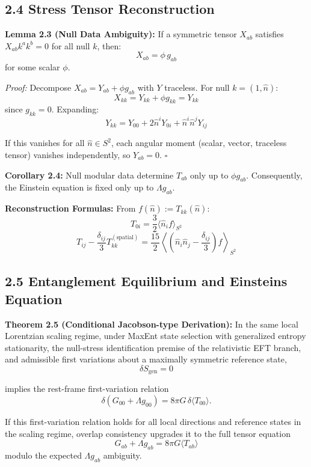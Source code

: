 \subsection{2.4 Stress Tensor Reconstruction}\label{24-stress-tensor-reconstruction}

\textbf{Lemma 2.3 (Null Data Ambiguity):} If a symmetric tensor \(X_{ab}\) satisfies \(X_{ab}k^a k^b = 0\) for all null \(k\), then: \[X_{ab} = \phi \, g_{ab}\] for some scalar \(\phi\).

\emph{Proof:} Decompose \(X_{ab} = Y_{ab} + \phi g_{ab}\) with \(Y\) traceless. For null \(k = (1, \hat{n})\): \[X_{kk} = Y_{kk} + \phi g_{kk} = Y_{kk}\] since \(g_{kk} = 0\). Expanding: \[Y_{kk} = Y_{00} + 2\hat{n}^i Y_{0i} + \hat{n}^i \hat{n}^j Y_{ij}\]

If this vanishes for all \(\hat{n} \in S^2\), each angular moment (scalar, vector, traceless tensor) vanishes independently, so \(Y_{ab} = 0\). \(\square\)

\textbf{Corollary 2.4:} Null modular data determine \(T_{ab}\) only up to \(\phi g_{ab}\). Consequently, the Einstein equation is fixed only up to \(\Lambda g_{ab}\).

\textbf{Reconstruction Formulas:} From \(f(\hat{n}) := T_{kk}(\hat{n})\): \[T_{0i} = \frac{3}{2}\langle \hat{n}_i f \rangle_{S^2}\] \[T_{ij} - \frac{\delta_{ij}}{3}T^{(\text{spatial})}_{kk} = \frac{15}{2}\left\langle \left(\hat{n}_i \hat{n}_j - \frac{\delta_{ij}}{3}\right) f \right\rangle_{S^2}\]

\subsection{2.5 Entanglement Equilibrium and Einstein\textquotesingle s Equation}\label{25-entanglement-equilibrium-and-einsteins-equation}

\textbf{Theorem 2.5 (Conditional Jacobson-type Derivation):} In the same local Lorentzian scaling regime, under MaxEnt state selection with generalized entropy stationarity, the null-stress identification premise of the relativistic EFT branch, and admissible first variations about a maximally symmetric reference state,
\[\delta S_{\text{gen}} = 0\]

implies the rest-frame first-variation relation
\[
\delta\!\left(G_{00} + \Lambda g_{00}\right) = 8\pi G \,\delta\langle T_{00} \rangle.
\]

If this first-variation relation holds for all local directions and reference states in the scaling regime, overlap consistency upgrades it to the full tensor equation
\[
G_{ab} + \Lambda g_{ab} = 8\pi G \langle T_{ab} \rangle
\]
modulo the expected \(\Lambda g_{ab}\) ambiguity.

